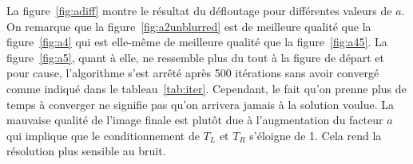 La figure~\ref{fig:adiff} montre le résultat du défloutage pour différentes valeurs de $a$.
On remarque que la figure~\ref{fig:a2unblurred} est de meilleure qualité que la figure~\ref{fig:a4} qui est elle-même de meilleure qualité que la figure~\ref{fig:a45}.
La figure~\ref{fig:a5}, quant à elle, ne ressemble plus du tout à la figure de départ et pour cause, l'algorithme s'est arrêté après 500 itérations sans avoir convergé comme indiqué dans le tableau~\ref{tab:iter}.
Cependant, le fait qu'on prenne plus de temps à converger ne signifie pas qu'on arrivera jamais à la solution voulue.
La mauvaise qualité de l'image finale est plutôt due à l'augmentation du facteur $a$ qui implique que le conditionnement de $T_L$
et $T_R$ s'éloigne de 1. Cela rend la résolution plus sensible au bruit.


